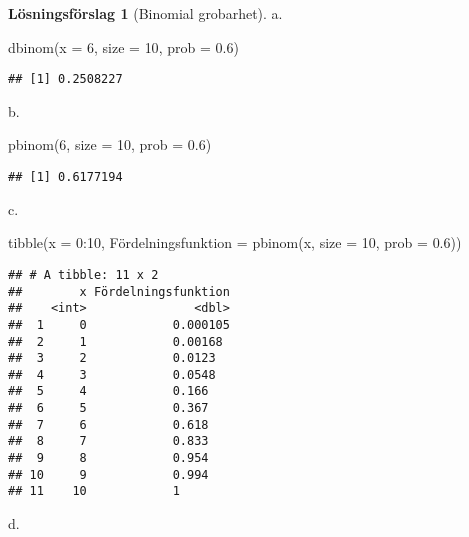 \documentclass[
]{book}
\newenvironment{Shaded}{\begin{snugshade}}{\end{snugshade}}
\newcommand{\AttributeTok}[1]{\textcolor[rgb]{0.77,0.63,0.00}{#1}}
\newcommand{\DecValTok}[1]{\textcolor[rgb]{0.00,0.00,0.81}{#1}}
\newcommand{\FloatTok}[1]{\textcolor[rgb]{0.00,0.00,0.81}{#1}}
\newcommand{\FunctionTok}[1]{\textcolor[rgb]{0.00,0.00,0.00}{#1}}
\newcommand{\NormalTok}[1]{#1}
\newcommand{\OtherTok}[1]{\textcolor[rgb]{0.56,0.35,0.01}{#1}}
\newcommand{\SpecialCharTok}[1]{\textcolor[rgb]{0.00,0.00,0.00}{#1}}
\theoremstyle{definition}
\theoremstyle{definition}
\theoremstyle{definition}
\theoremstyle{definition}
\newtheorem{hypothesis}{Lösningsförslag}[chapter]
\theoremstyle{remark}
\begin{document}
\begin{hypothesis}[Binomial grobarhet]
a.

\begin{Shaded}
\begin{Highlighting}[]
\FunctionTok{dbinom}\NormalTok{(}\AttributeTok{x =} \DecValTok{6}\NormalTok{, }\AttributeTok{size =} \DecValTok{10}\NormalTok{, }\AttributeTok{prob =} \FloatTok{0.6}\NormalTok{)}
\end{Highlighting}
\end{Shaded}

\begin{verbatim}
## [1] 0.2508227
\end{verbatim}

b.

\begin{Shaded}
\begin{Highlighting}[]
\FunctionTok{pbinom}\NormalTok{(}\DecValTok{6}\NormalTok{, }\AttributeTok{size =} \DecValTok{10}\NormalTok{, }\AttributeTok{prob =} \FloatTok{0.6}\NormalTok{)}
\end{Highlighting}
\end{Shaded}

\begin{verbatim}
## [1] 0.6177194
\end{verbatim}

c.

\begin{Shaded}
\begin{Highlighting}[]
\FunctionTok{tibble}\NormalTok{(}\AttributeTok{x =} \DecValTok{0}\SpecialCharTok{:}\DecValTok{10}\NormalTok{,}
\NormalTok{       Fördelningsfunktion }\OtherTok{=} \FunctionTok{pbinom}\NormalTok{(x, }\AttributeTok{size =} \DecValTok{10}\NormalTok{, }\AttributeTok{prob =} \FloatTok{0.6}\NormalTok{))}
\end{Highlighting}
\end{Shaded}

\begin{verbatim}
## # A tibble: 11 x 2
##        x Fördelningsfunktion
##    <int>               <dbl>
##  1     0            0.000105
##  2     1            0.00168 
##  3     2            0.0123  
##  4     3            0.0548  
##  5     4            0.166   
##  6     5            0.367   
##  7     6            0.618   
##  8     7            0.833   
##  9     8            0.954   
## 10     9            0.994   
## 11    10            1
\end{verbatim}

d.


\end{hypothesis}
\end{document}
